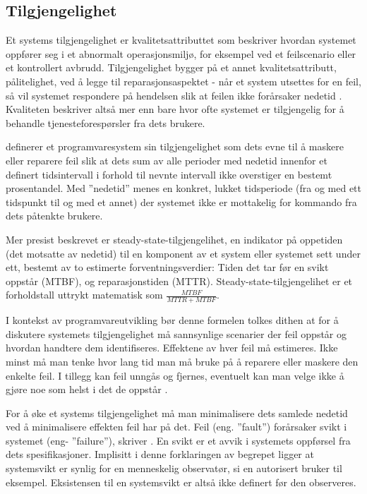 \subsection{Tilgjengelighet}

Et systems tilgjengelighet er kvalitetsattributtet som beskriver hvordan systemet oppfører seg i et abnormalt operasjonsmiljø, for eksempel ved et feilscenario eller et kontrollert avbrudd. Tilgjengelighet bygger på et annet kvalitetsattributt, pålitelighet, ved å legge til reparasjonsaspektet - når et system utsettes for en feil, så vil systemet respondere på hendelsen slik at feilen ikke forårsaker nedetid \citep{BCK2013}. Kvaliteten beskriver altså mer enn bare hvor ofte systemet er tilgjengelig for å behandle tjenesteforespørsler fra dets brukere.

\cite{BCK2013} definerer et programvaresystem sin tilgjengelighet som dets evne til å maskere eller reparere feil slik at dets sum av alle perioder med nedetid innenfor et definert tidsintervall i forhold til nevnte intervall ikke overstiger en bestemt prosentandel. Med ''nedetid'' menes en konkret, lukket tidsperiode (fra og med ett tidspunkt til og med et annet) der systemet ikke er mottakelig for kommando fra dets påtenkte brukere.

Mer presist beskrevet er steady-state-tilgjengelihet, en indikator på oppetiden (det motsatte av nedetid) til en komponent av et system eller systemet sett under ett, bestemt av to estimerte forventningsverdier: Tiden det tar før en svikt oppstår (MTBF), og reparasjonstiden (MTTR). Steady-state-tilgjengelihet er et forholdstall uttrykt matematisk som $ \frac{MTBF}{MTTR+MTBF} $.

I kontekst av programvareutvikling bør denne formelen tolkes dithen at for å diskutere systemets tilgjengelighet må sannsynlige scenarier der feil oppstår og hvordan handtere dem identifiseres. Effektene av hver feil må estimeres. Ikke minst må man tenke hvor lang tid man må bruke på å reparere eller maskere den enkelte feil. I tillegg kan feil unngås og fjernes, eventuelt kan man velge ikke å gjøre noe som helst i det de oppstår \citep{BCK2013}.

For å øke et systems tilgjengelighet må man minimalisere dets samlede nedetid ved å minimalisere effekten feil har på det. Feil (eng. ''fault'') forårsaker svikt i systemet (eng- ''failure''), skriver \cite{BCK2013}. En svikt er et avvik i systemets oppførsel fra dets spesifikasjoner. Implisitt i denne forklaringen av begrepet ligger at systemsvikt er synlig for en menneskelig observatør, si en autorisert bruker til eksempel. Eksistensen til en systemsvikt er altså ikke definert før den observeres.

